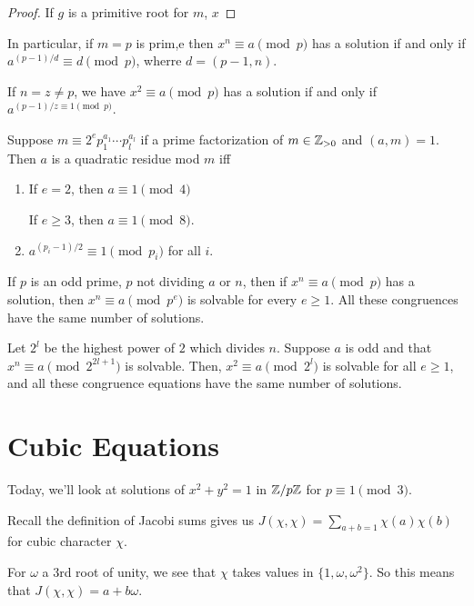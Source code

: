\documentclass{article}
\begin{document}
\begin{proof}
    If $g$ is a primitive root for $m$, $x $
\end{proof}

In particular, if $m = p$ is prim,e then $x^n \equiv a \pmod p$ has a solution if and only if $a^{(p-1)/d} \equiv d \pmod p$, wherre $d = (p-1, n)$.

If $n = z \neq p$, we have $x^2 \equiv a \pmod p$ has a solution if and only if $a^{(p-1)/z \equiv 1 \pmod p}$.

\begin{lemma}
    Suppose $m \equiv 2^e p_1^{a_1} \cdots p_l^{a_l}$ if a prime factorization of $m \in \mathbb Z_{> 0}$ and $(a, m) = 1$. Then $a$ is a quadratic residue mod $m$ iff 
    \begin{enumerate}[label=(\alph*)]
        \item If $e = 2$, then $a \equiv 1 \pmod 4$

        If $e \geq 3$, then $a \equiv 1 \pmod 8$.
        \item $a^{(p_i - 1)/2} \equiv 1 \pmod{p_i}$ for all $i$.
    \end{enumerate}
\end{lemma}

\begin{lemma}
    If $p$ is an odd prime, $p$ not dividing $a$ or $n$, then if $x^n \equiv a \pmod p$ has a solution, then $x^n \equiv a \pmod{p^e}$ is solvable for every $e \geq 1$. All these congruences have the same number of solutions.
\end{lemma}

\begin{lemma}
    Let $2^l$ be the highest power of $2$ which divides $n$. Suppose $a$ is odd and that $x^n \equiv a \pmod{2^{2l + 1}}$ is solvable. Then, $x^2 \equiv a \pmod{2^l}$ is solvable for all $e \geq 1$, and all these congruence equations have the same number of solutions.
\end{lemma}

\section{Cubic Equations}
Today, we'll look at solutions of $x^2 + y^2 = 1$ in $\mathbb Z / p\mathbb Z$ for $p \equiv 1 \pmod 3$.

Recall the definition of Jacobi sums gives us $J(\chi, \chi) = \sum_{a + b = 1} \chi(a) \chi(b)$ for cubic character $\chi$.

For $\omega$ a 3rd root of unity, we see that $\chi$ takes values in $\{1, \omega, \omega^2\}$. So this means that $J(\chi, \chi) = a + b\omega$.
\end{document}
